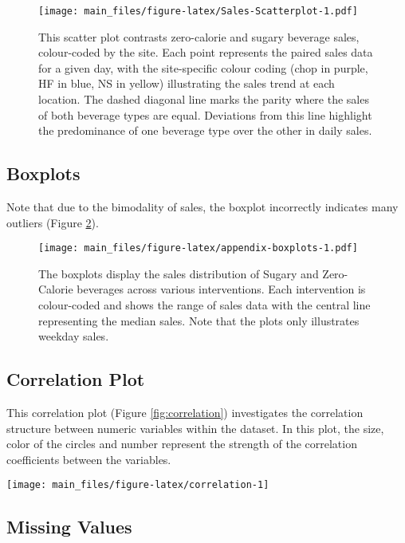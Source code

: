 \documentclass[
]{article}
\begin{document}
\begin{figure}
\centering
\texttt{[image: main\_files/figure-latex/Sales-Scatterplot-1.pdf]}
\caption{\label{fig:Sales-Scatterplot}This scatter plot contrasts zero-calorie and sugary beverage sales, colour-coded by the site. Each point represents the paired sales data for a given day, with the site-specific colour coding (chop in purple, HF in blue, NS in yellow) illustrating the sales trend at each location. The dashed diagonal line marks the parity where the sales of both beverage types are equal. Deviations from this line highlight the predominance of one beverage type over the other in daily sales.}
\end{figure}

\hypertarget{boxplots}{%
\subsection{Boxplots}\label{boxplots}}

Note that due to the bimodality of sales, the boxplot incorrectly indicates many outliers (Figure \ref{fig:appendix-boxplots}).

\begin{figure}
\centering
\texttt{[image: main\_files/figure-latex/appendix-boxplots-1.pdf]}
\caption{\label{fig:appendix-boxplots}The boxplots display the sales distribution of Sugary and Zero-Calorie beverages across various interventions. Each intervention is colour-coded and shows the range of sales data with the central line representing the median sales. Note that the plots only illustrates weekday sales.}
\end{figure}

\hypertarget{correlation-plot}{%
\subsection{Correlation Plot}\label{correlation-plot}}

This correlation plot (Figure \ref{fig:correlation}) investigates the correlation structure between numeric variables within the dataset. In this plot, the size, color of the circles and number represent the strength of the correlation coefficients between the variables.

\begin{center}\texttt{[image: main\_files/figure-latex/correlation-1]} \end{center}

\hypertarget{missing-values}{%
\subsection{Missing Values}\label{missing-values}}
\end{document}
